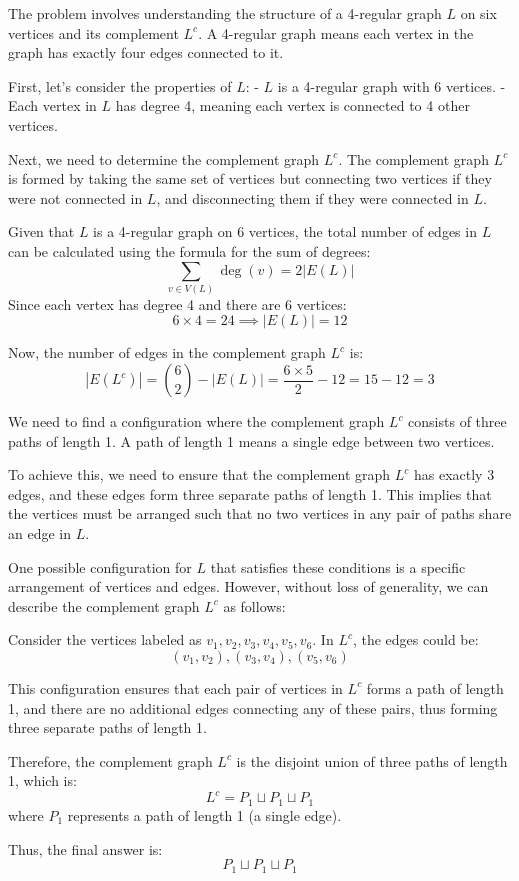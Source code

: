 The problem involves understanding the structure of a 4-regular graph \( L \) on six vertices and its complement \( L^c \). A 4-regular graph means each vertex in the graph has exactly four edges connected to it.

First, let's consider the properties of \( L \):
- \( L \) is a 4-regular graph with 6 vertices.
- Each vertex in \( L \) has degree 4, meaning each vertex is connected to 4 other vertices.

Next, we need to determine the complement graph \( L^c \). The complement graph \( L^c \) is formed by taking the same set of vertices but connecting two vertices if they were not connected in \( L \), and disconnecting them if they were connected in \( L \).

Given that \( L \) is a 4-regular graph on 6 vertices, the total number of edges in \( L \) can be calculated using the formula for the sum of degrees:
\[
\sum_{v \in V(L)} \deg(v) = 2|E(L)|
\]
Since each vertex has degree 4 and there are 6 vertices:
\[
6 \times 4 = 24 \implies |E(L)| = 12
\]

Now, the number of edges in the complement graph \( L^c \) is:
\[
|E(L^c)| = \binom{6}{2} - |E(L)| = \frac{6 \times 5}{2} - 12 = 15 - 12 = 3
\]

We need to find a configuration where the complement graph \( L^c \) consists of three paths of length 1. A path of length 1 means a single edge between two vertices.

To achieve this, we need to ensure that the complement graph \( L^c \) has exactly 3 edges, and these edges form three separate paths of length 1. This implies that the vertices must be arranged such that no two vertices in any pair of paths share an edge in \( L \).

One possible configuration for \( L \) that satisfies these conditions is a specific arrangement of vertices and edges. However, without loss of generality, we can describe the complement graph \( L^c \) as follows:

Consider the vertices labeled as \( v_1, v_2, v_3, v_4, v_5, v_6 \). In \( L^c \), the edges could be:
\[
(v_1, v_2), (v_3, v_4), (v_5, v_6)
\]

This configuration ensures that each pair of vertices in \( L^c \) forms a path of length 1, and there are no additional edges connecting any of these pairs, thus forming three separate paths of length 1.

Therefore, the complement graph \( L^c \) is the disjoint union of three paths of length 1, which is:
\[
L^c = P_1 \sqcup P_1 \sqcup P_1
\]
where \( P_1 \) represents a path of length 1 (a single edge).

Thus, the final answer is:
\[
\boxed{P_1 \sqcup P_1 \sqcup P_1}
\]